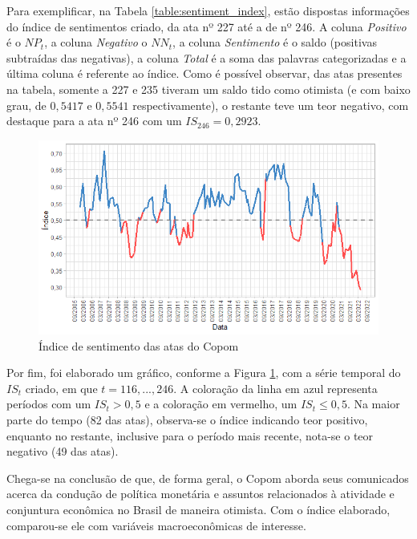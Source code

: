 Para exemplificar, na Tabela \ref{table:sentiment_index}, estão dispostas informações do índice de sentimentos criado, da ata nº 227 até a de nº 246. A coluna \textit{Positivo} é o $NP_{t}$, a coluna \textit{Negativo} o $NN_{t}$, a coluna \textit{Sentimento} é o saldo (positivas subtraídas das negativas), a coluna \textit{Total} é a soma das palavras categorizadas e a última coluna é referente ao índice. Como é possível observar, das atas presentes na tabela, somente a 227 e 235 tiveram um saldo tido como otimista (e com baixo grau, de $0,5417$ e $0,5541$ respectivamente), o restante teve um teor negativo, com destaque para a ata nº 246 com um $IS_{246} = 0,2923$. 

\begin{figure}[hbtp]
	\centering
	\caption{Índice de sentimento das atas do Copom} \label{figure:sentiment_index}
	\includegraphics[scale = 0.75]{figuras/indice_de_sentimentos.png}
\end{figure}

Por fim, foi elaborado um gráfico, conforme a Figura \ref{figure:sentiment_index}, com a série temporal do $IS_{t}$ criado, em que $t = 116,...,246$. A coloração da linha em azul representa períodos com um $IS_{t} > 0,5$ e a coloração em vermelho, um $IS_{t} \leq 0,5$. Na maior parte do tempo (82 das atas), observa-se o índice indicando teor positivo, enquanto no restante, inclusive para o período mais recente, nota-se o teor negativo (49 das atas).

Chega-se na conclusão de que, de forma geral, o Copom aborda seus comunicados acerca da condução de política monetária e assuntos relacionados à atividade e conjuntura econômica no Brasil de maneira otimista. Com o índice elaborado, comparou-se ele com variáveis macroeconômicas de interesse.


